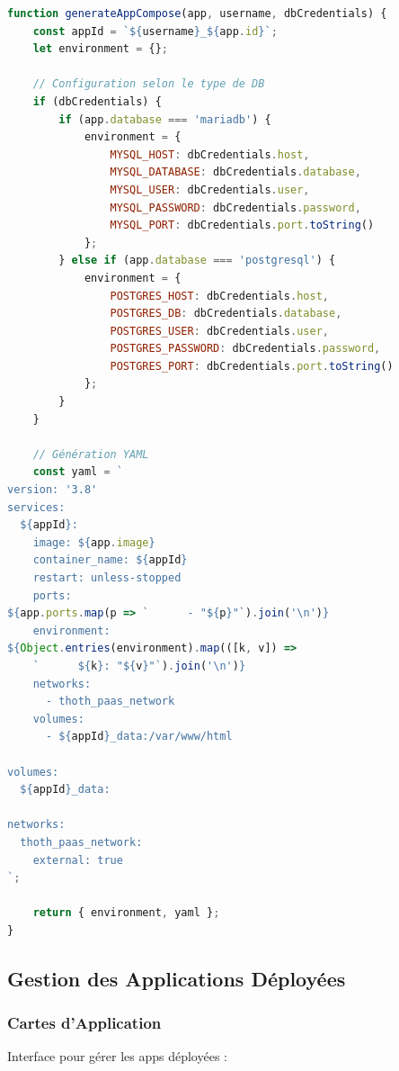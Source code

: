 \documentclass[12pt,a4paper]{article}
\begin{document}
\begin{lstlisting}[language=JavaScript,caption=Génération compose (paas-catalog.js)]
function generateAppCompose(app, username, dbCredentials) {
    const appId = `${username}_${app.id}`;
    let environment = {};
    
    // Configuration selon le type de DB
    if (dbCredentials) {
        if (app.database === 'mariadb') {
            environment = {
                MYSQL_HOST: dbCredentials.host,
                MYSQL_DATABASE: dbCredentials.database,
                MYSQL_USER: dbCredentials.user,
                MYSQL_PASSWORD: dbCredentials.password,
                MYSQL_PORT: dbCredentials.port.toString()
            };
        } else if (app.database === 'postgresql') {
            environment = {
                POSTGRES_HOST: dbCredentials.host,
                POSTGRES_DB: dbCredentials.database,
                POSTGRES_USER: dbCredentials.user,
                POSTGRES_PASSWORD: dbCredentials.password,
                POSTGRES_PORT: dbCredentials.port.toString()
            };
        }
    }
    
    // Génération YAML
    const yaml = `
version: '3.8'
services:
  ${appId}:
    image: ${app.image}
    container_name: ${appId}
    restart: unless-stopped
    ports:
${app.ports.map(p => `      - "${p}"`).join('\n')}
    environment:
${Object.entries(environment).map(([k, v]) => 
    `      ${k}: "${v}"`).join('\n')}
    networks:
      - thoth_paas_network
    volumes:
      - ${appId}_data:/var/www/html

volumes:
  ${appId}_data:

networks:
  thoth_paas_network:
    external: true
`;
    
    return { environment, yaml };
}
\end{lstlisting}

\subsection{Gestion des Applications Déployées}

\subsubsection{Cartes d'Application}

Interface pour gérer les apps déployées :
\end{document}
